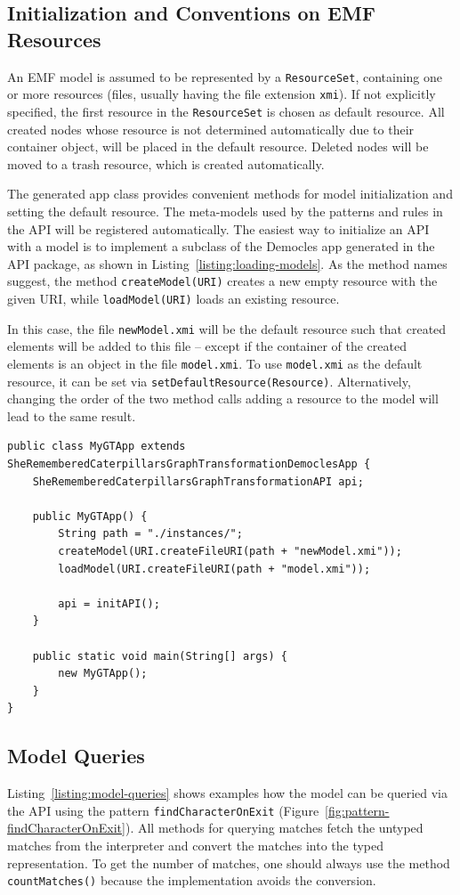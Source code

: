 \subsection{Initialization and Conventions on EMF Resources}
\label{api-conventions}
An EMF model is assumed to be represented by a \texttt{ResourceSet}, containing one or more resources (files, usually having the file extension \texttt{xmi}).
If not explicitly specified, the first resource in the \texttt{ResourceSet} is chosen as default resource.
All created nodes whose resource is not determined automatically due to their container object, will be placed in the default resource.
Deleted nodes will be moved to a trash resource, which is created automatically.

The generated app class provides convenient methods for model initialization and setting the default resource.
The meta-models used by the patterns and rules in the API will be registered automatically.
The easiest way to initialize an API with a model is to implement a subclass of the Democles app generated in the API package, as shown in Listing~\ref{listing:loading-models}.
As the method names suggest, the method \texttt{createModel(URI)} creates a new empty resource with the given URI, while \texttt{loadModel(URI)} loads an existing resource.

In this case, the file \texttt{newModel.xmi} will be the default resource such that created elements will be added to this file -- except if the container of the created elements is an object in the file \texttt{model.xmi}.
To use \texttt{model.xmi} as the default resource, it can be set via \texttt{setDefaultResource(Resource)}. Alternatively, changing the order of the two method calls adding a resource to the model will lead to the same result.

\begin{lstlisting}[caption={Loading Models}, label={listing:loading-models}]
public class MyGTApp extends SheRememberedCaterpillarsGraphTransformationDemoclesApp {
	SheRememberedCaterpillarsGraphTransformationAPI api;

	public MyGTApp() {
		String path = "./instances/";
		createModel(URI.createFileURI(path + "newModel.xmi"));
		loadModel(URI.createFileURI(path + "model.xmi"));

		api = initAPI();
	}

	public static void main(String[] args) {
		new MyGTApp();
	}
}
\end{lstlisting}

\subsection{Model Queries}
\label{api-model-queries}
Listing~\ref{listing:model-queries} shows examples how the model can be queried via the API using the pattern \texttt{findCharacterOnExit} (Figure~\ref{fig:pattern-findCharacterOnExit}).
All methods for querying matches fetch the untyped matches from the interpreter and convert the matches into the typed representation.
To get the number of matches, one should always use the method \texttt{countMatches()} because the implementation avoids the conversion.

